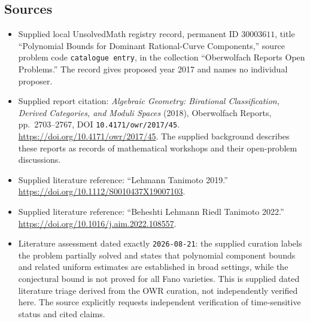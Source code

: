 \documentclass[11pt]{article}
\begin{document}
\subsection{Sources}
\begin{itemize}
\item Supplied local UnsolvedMath registry record, permanent ID \(30003611\), title ``Polynomial Bounds for Dominant Rational-Curve Components,'' source problem code \texttt{catalogue entry}, in the collection ``Oberwolfach Reports Open Problems.'' The record gives proposed year 2017 and names no individual proposer.
\item Supplied report citation: \emph{Algebraic Geometry: Birational Classification, Derived Categories, and Moduli Spaces} (2018), Oberwolfach Reports, pp.\ 2703--2767, DOI \texttt{10.4171/owr/2017/45}. \url{https://doi.org/10.4171/owr/2017/45}. The supplied background describes these reports as records of mathematical workshops and their open-problem discussions.
\item Supplied literature reference: ``Lehmann Tanimoto 2019.'' \url{https://doi.org/10.1112/S0010437X19007103}.
\item Supplied literature reference: ``Beheshti Lehmann Riedl Tanimoto 2022.'' \url{https://doi.org/10.1016/j.aim.2022.108557}.
\item Literature assessment dated exactly \texttt{2026-08-21}: the supplied curation labels the problem partially solved and states that polynomial component bounds and related uniform estimates are established in broad settings, while the conjectural bound is not proved for all Fano varieties. This is supplied dated literature triage derived from the OWR curation, not independently verified here. The source explicitly requests independent verification of time-sensitive status and cited claims.
\end{itemize}
\end{document}
